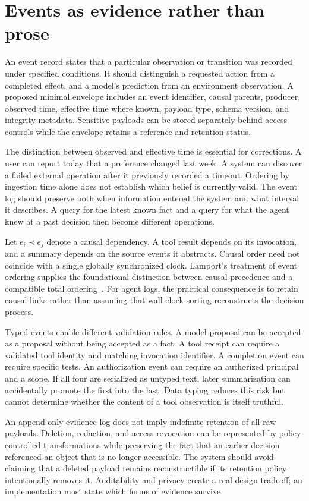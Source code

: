 \section{Events as evidence rather than prose}\label{sec:C13:events}
An event record states that a particular observation or transition was recorded under specified conditions. It should distinguish a requested action from a completed effect, and a model's prediction from an environment observation. A proposed minimal envelope includes an event identifier, causal parents, producer, observed time, effective time where known, payload type, schema version, and integrity metadata. Sensitive payloads can be stored separately behind access controls while the envelope retains a reference and retention status.

The distinction between observed and effective time is essential for corrections. A user can report today that a preference changed last week. A system can discover a failed external operation after it previously recorded a timeout. Ordering by ingestion time alone does not establish which belief is currently valid. The event log should preserve both when information entered the system and what interval it describes. A query for the latest known fact and a query for what the agent knew at a past decision then become different operations.

Let $e_i\prec e_j$ denote a causal dependency. A tool result depends on its invocation, and a summary depends on the source events it abstracts. Causal order need not coincide with a single globally synchronized clock. Lamport's treatment of event ordering supplies the foundational distinction between causal precedence and a compatible total ordering~\cite{lamport1978clocks}. For agent logs, the practical consequence is to retain causal links rather than assuming that wall-clock sorting reconstructs the decision process.

Typed events enable different validation rules. A model proposal can be accepted as a proposal without being accepted as a fact. A tool receipt can require a validated tool identity and matching invocation identifier. A completion event can require specific tests. An authorization event can require an authorized principal and a scope. If all four are serialized as untyped text, later summarization can accidentally promote the first into the last. Data typing reduces this risk but cannot determine whether the content of a tool observation is itself truthful.

An append-only evidence log does not imply indefinite retention of all raw payloads. Deletion, redaction, and access revocation can be represented by policy-controlled transformations while preserving the fact that an earlier decision referenced an object that is no longer accessible. The system should avoid claiming that a deleted payload remains reconstructible if its retention policy intentionally removes it. Auditability and privacy create a real design tradeoff; an implementation must state which forms of evidence survive.

